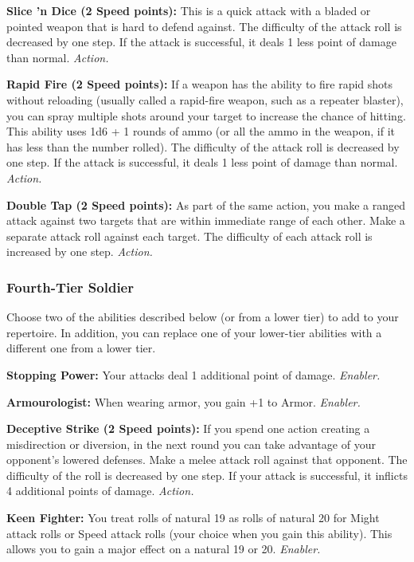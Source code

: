 \documentclass[a4paper,10pt,final,twocolumn,oneside]{book}
\newcommand{\itemAbility}[2]{\textcolor{25gray}{\textbullet\textbf{ #1:}}{ #2}\par}
\newcommand{\enabler}{\textit{ Enabler.}}
\newcommand{\action}{\textit{ Action.}}
\begin{document}
\itemAbility{Slice 'n Dice (2 Speed points)}{This is a quick attack with a bladed or pointed weapon that is hard to defend against. The difficulty of the attack roll is decreased by one step. If the attack is successful, it deals 1 less point of damage than normal.\action}

\itemAbility{Rapid Fire (2 Speed points)}{If a weapon has the ability to fire rapid shots without reloading (usually called a rapid-fire weapon, such as a repeater blaster), you can spray multiple shots around your target to increase the chance of hitting. This ability uses 1d6 + 1 rounds of ammo (or all the ammo in the weapon, if it has less than the number rolled). The difficulty of the attack roll is decreased by one step. If the attack is successful, it deals 1 less point of damage than normal.\action}

\itemAbility{Double Tap (2 Speed points)}{As part of the same action, you make a ranged attack against two targets that are within immediate range of each other. Make a separate attack roll against each target. The difficulty of each attack roll is increased by one step.\action}


\subsubsection*{Fourth-Tier Soldier}
\label{subsub:soldierFourthTier}

Choose two of the abilities described below (or from a lower tier) to add to your repertoire. In addition, you can replace one of your lower-tier abilities with a different one from a lower tier.

\itemAbility{Stopping Power}{Your attacks deal 1 additional point of damage.\enabler}

\itemAbility{Armourologist}{When wearing armor, you gain +1 to Armor.\enabler}

\itemAbility{Deceptive Strike (2 Speed points)}{If you spend one action creating a misdirection or diversion, in the next round you can take advantage of your opponent’s lowered defenses. Make a melee attack roll against that opponent. The difficulty of the roll is decreased by one step. If your attack is successful, it inflicts 4 additional points of damage.\action}

\itemAbility{Keen Fighter}{You treat rolls of natural 19 as rolls of natural 20 for Might attack rolls or Speed attack rolls (your choice when you gain this ability). This allows you to gain a major effect on a natural 19 or 20.\enabler}
\end{document}
